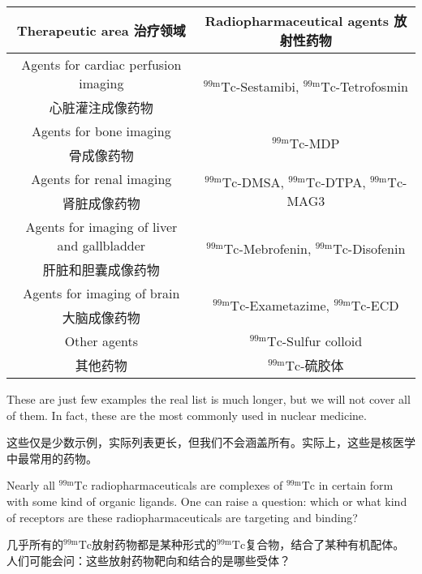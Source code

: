 \documentclass[dvipsnames, svgnames,a4paper,11pt]{article}
\begin{document}
\begin{table}[h]
      \centering
       \label{table5}
      \begin{tabular}{cc}
      \toprule
      \textbf{Therapeutic area 治疗领域} & \textbf{Radiopharmaceutical agents 放射性药物} \\
      \midrule
      Agents for cardiac perfusion imaging & \multirow{2}{*}{\centering \(\mathrm{^{99m}Tc}\)-Sestamibi, \(\mathrm{^{99m}Tc}\)-Tetrofosmin} \\
      心脏灌注成像药物 & \\
      Agents for bone imaging &\multirow{2}{*}{ \(\mathrm{^{99m}Tc}\)-MDP} \\
      骨成像药物 &  \\
      Agents for renal imaging & \multirow{2}{*}{ \(\mathrm{^{99m}Tc}\)-DMSA, \(\mathrm{^{99m}Tc}\)-DTPA, \(\mathrm{^{99m}Tc}\)-MAG3} \\
      肾脏成像药物 & \\
      Agents for imaging of liver and gallbladder & \multirow{2}{*}{\centering \(\mathrm{^{99m}Tc}\)-Mebrofenin, \(\mathrm{^{99m}Tc}\)-Disofenin} \\
      肝脏和胆囊成像药物 & \\
      Agents for imaging of brain & \multirow{2}{*}{\centering \(\mathrm{^{99m}Tc}\)-Exametazime, \(\mathrm{^{99m}Tc}\)-ECD} \\
      大脑成像药物 & \\
      Other agents & \(\mathrm{^{99m}Tc}\)-Sulfur colloid \\
      其他药物 & \(\mathrm{^{99m}Tc}\)-硫胶体 \\
      \bottomrule
      \end{tabular}
      \end{table}

These are just few examples the real list is much longer, but we will not cover all of
them. In fact, these are the most commonly used in nuclear medicine.

这些仅是少数示例，实际列表更长，但我们不会涵盖所有。实际上，这些是核医学中最常用的药物。

Nearly all ${}^\mathrm{99m}\mathrm{Tc}$ radiopharmaceuticals are complexes of ${}^\mathrm{99m}\mathrm{Tc}$ in certain form with
some kind of organic ligands. One can raise a question: which or what kind of
receptors are these radiopharmaceuticals are targeting and binding?

几乎所有的${}^\mathrm{99m}\mathrm{Tc}$放射药物都是某种形式的${}^\mathrm{99m}\mathrm{Tc}$复合物，结合了某种有机配体。人们可能会问：这些放射药物靶向和结合的是哪些受体？
\end{document}
